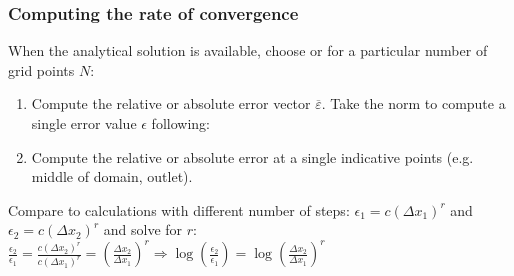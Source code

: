 {\nologo
\begin{frame}
  \frametitle{Computing the rate of convergence}
  \footnotesize\selectfont
  When the analytical solution is available, choose  or  for a particular number of grid points $N$:
  \begin{enumerate}
  \footnotesize\selectfont
    \item Compute the relative or absolute error vector $\overline{\varepsilon}$. Take the norm to compute a single error value $\epsilon$ following:
    \item Compute the relative or absolute error at a single indicative points (e.g. middle of domain, outlet).
  \end{enumerate}
  \pause
  Compare to calculations with different number of steps: $\epsilon_1 = c(\Delta x_1)^r $ and $\epsilon_2 = c(\Delta x_2)^r $ and solve for $r$: \\ \vfill
  $ \displaystyle
    \frac{\epsilon_2}{\epsilon_1} = \frac{c(\Delta x_2)^r}{c(\Delta x_1)^r} = \left(\frac{\Delta x_2}{\Delta x_1}\right)^r \Rightarrow \log\left( \frac{\epsilon_2}{\epsilon_1}\right) = \log\left( \frac{\Delta x_2}{\Delta x_1}\right)^r $ 
  \vfill
\end{frame}
}

